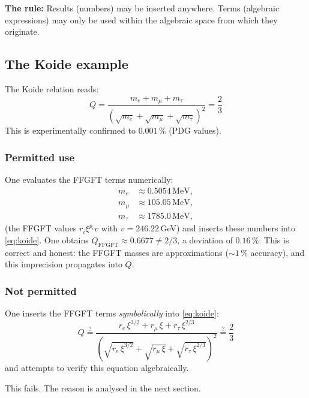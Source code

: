 \textbf{The rule:} Results (numbers) may be inserted anywhere.
Terms (algebraic expressions) may only be used within the algebraic space
from which they originate.

\subsection{The Koide example}

The Koide relation reads:
\begin{equation}
  Q = \frac{m_e + m_\mu + m_\tau}{(\sqrt{m_e}+\sqrt{m_\mu}+\sqrt{m_\tau})^2}
  = \frac{2}{3}
  \label{eq:koide}
\end{equation}
This is experimentally confirmed to $0{.}001\,\%$ (PDG values).

\subsubsection*{Permitted use}

One evaluates the FFGFT terms numerically:
\begin{align*}
  m_e &\approx 0{.}5054\,\text{MeV}, \\
  m_\mu &\approx 105{.}05\,\text{MeV}, \\
  m_\tau &\approx 1785{.}0\,\text{MeV},
\end{align*}
(the FFGFT values $r_i\xi^{p_i}v$ with $v = 246.22$\,GeV)
and inserts these numbers into \eqref{eq:koide}. One obtains
$Q_{\text{FFGFT}} \approx 0{.}6677 \neq 2/3$, a deviation of $0{.}16\,\%$.
This is correct and honest: the FFGFT masses are approximations
($\sim 1\,\%$ accuracy), and this imprecision propagates into $Q$.

\subsubsection*{Not permitted}

One inserts the FFGFT terms \emph{symbolically} into \eqref{eq:koide}:
\begin{equation}
  Q \stackrel{?}{=}
  \frac{r_e\,\xi^{3/2} + r_\mu\,\xi + r_\tau\,\xi^{2/3}}
  {(\sqrt{r_e\,\xi^{3/2}}+\sqrt{r_\mu\,\xi}+\sqrt{r_\tau\,\xi^{2/3}})^2}
  \stackrel{?}{=} \frac{2}{3}
  \label{eq:wrong}
\end{equation}
and attempts to verify this equation algebraically.

This fails. The reason is analysed in the next section.

